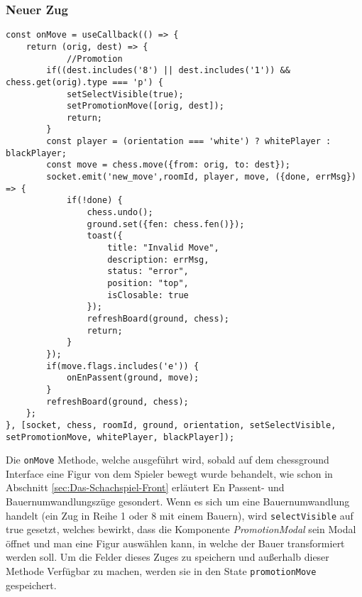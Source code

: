 \subsubsection{Neuer Zug}

\begin{lstlisting}[style=codeStyle, caption={Die onMove Methode}, label={lst:onMove}]
const onMove = useCallback(() => {
    return (orig, dest) => {
    		//Promotion
        if((dest.includes('8') || dest.includes('1')) && chess.get(orig).type === 'p') { 
            setSelectVisible(true);
            setPromotionMove([orig, dest]);
            return;
        }
        const player = (orientation === 'white') ? whitePlayer : blackPlayer;
        const move = chess.move({from: orig, to: dest});
        socket.emit('new_move',roomId, player, move, ({done, errMsg}) => {
            if(!done) {
                chess.undo();
                ground.set({fen: chess.fen()});
                toast({
                    title: "Invalid Move",
                    description: errMsg,
                    status: "error",
                    position: "top",
                    isClosable: true
                });
                refreshBoard(ground, chess);
                return;
            }
        });
        if(move.flags.includes('e')) {
            onEnPassent(ground, move);
        }
        refreshBoard(ground, chess);
    };
}, [socket, chess, roomId, ground, orientation, setSelectVisible, setPromotionMove, whitePlayer, blackPlayer]);
\end{lstlisting}

Die \verb|onMove| Methode, welche ausgeführt wird, sobald auf dem chessground Interface eine Figur von dem Spieler bewegt wurde behandelt, wie schon in Abschnitt \ref{sec:Das-Schachspiel-Front} erläutert En Passent- und Bauernumwandlungszüge gesondert. Wenn es sich um eine Bauernumwandlung handelt (ein Zug in Reihe 1 oder 8 mit einem Bauern), wird \verb|selectVisible| auf true gesetzt, welches bewirkt, dass die Komponente \textit{PromotionModal} sein Modal öffnet und man eine Figur auswählen kann, in welche der Bauer transformiert werden soll. Um die Felder dieses Zuges zu speichern und außerhalb dieser Methode Verfügbar zu machen, werden sie in den State \verb|promotionMove| gespeichert.

